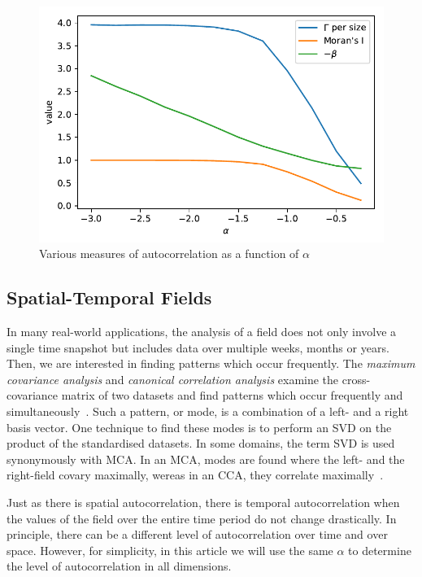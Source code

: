 \documentclass{acm_proc_article-sp}
\begin{document}
\begin{figure}[h]
\begin{center}
\includegraphics[width=0.8\columnwidth]{Results/plotGammaAndMoransIAndBeta.pdf}
\caption[Various measures of autocorrelation]{Various measures of autocorrelation as a function of $\alpha$}
\label{fig:plotGammaAndMoransIAndBeta}
\end{center}
\end{figure}

\subsection{Spatial-Temporal Fields}
\label{sec:Introduction Spatial-Temporal Fields}

In many real-world applications, the analysis of a field does not only involve a single time snapshot but includes data over multiple weeks, months or years. Then, we are interested in finding patterns which occur frequently. The \textit{maximum covariance analysis} and \textit{canonical correlation analysis} examine the cross-covariance matrix of two datasets and find patterns which occur frequently and simultaneously~\cite{Eshel2011, Storch1999}. Such a pattern, or mode, is a combination of a left- and a right basis vector. One technique to find these modes is to perform an SVD on the product of the standardised datasets. In some domains, the term SVD is used synonymously with MCA. In an MCA, modes are found where the left- and the right-field covary maximally, wereas in an CCA, they correlate maximally~\cite{Bretherton1992}.

Just as there is spatial autocorrelation, there is temporal autocorrelation when the values of the field over the entire time period do not change drastically. In principle, there can be a different level of autocorrelation over time and over space. However, for simplicity, in this article we will use the same $\alpha$ to determine the level of autocorrelation in all dimensions.
\end{document}
